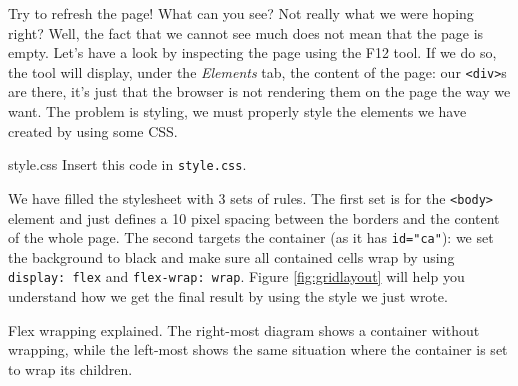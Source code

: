Try to refresh the page! What can you see? Not really what we were hoping right? Well, the fact that
we cannot see much does not mean that the page is empty. Let's have a look by inspecting the page
using the F12 tool. If we do so, the tool will display, under the \textit{Elements} tab, the
content of the page: our \texttt{<div>}s are there, it's just that the browser is not rendering
them on the page the way we want. The problem is styling, we must properly style the elements we
have created by using some CSS.

\begin{programcode}{style.css}
Insert this code in \texttt{style.css}.
\end{programcode}

We have filled the stylesheet with 3 sets of rules. The first set is for the \texttt{<body>} element
and just defines a 10 pixel spacing between the borders and the content of the whole page.
The second targets
the container (as it has \texttt{id="ca"}): we set the background to black and
make sure all contained cells wrap by using \texttt{display: flex} and \texttt{flex-wrap: wrap}.
Figure \ref{fig:gridlayout} will help you understand how we get the final result by using the
style we just wrote.

%
\begin{marginfigure}
  
  \caption[Flex wrapping]{Flex wrapping explained. The right-most diagram shows a container without wrapping,
  while the left-most shows the same situation where the container is set to wrap its children.}
  \label{fig:flexwrap}
\end{marginfigure}
%

